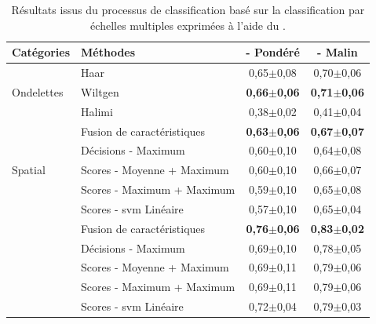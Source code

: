 \begin{table}[H]
    \centering
    \begin{tabular}{llcc}
        \toprule
        Catégories                  & Méthodes                      & \Fscore{} - Pondéré   & \Fscore{} - Malin     \\ \midrule
        \multirow{3}{*}{Ondelettes} & Haar                          & 0,65$\pm$0,08         & 0,70$\pm$0,06         \\
                                    & Wiltgen~\cite{Wiltgen2008}    & \textbf{0,66$\pm$0,06}& \textbf{0,71$\pm$0,06}\\
                                    & Halimi~\cite{Halimi2017a}     & 0,38$\pm$0,02         & 0,41$\pm$0,04         \\ \midrule
        \multirow{5}{*}{Spatial}    & Fusion de caractéristiques    & \textbf{0,63$\pm$0,06}& \textbf{0,67$\pm$0,07}\\
                                    & Décisions - Maximum           & 0,60$\pm$0,10         & 0,64$\pm$0,08         \\
                                    & Scores - Moyenne + Maximum    & 0,60$\pm$0,10         & 0,66$\pm$0,07         \\
                                    & Scores - Maximum + Maximum    & 0,59$\pm$0,10         & 0,65$\pm$0,08         \\
                                    & Scores - \gls{svm} Linéaire   & 0,57$\pm$0,10         & 0,65$\pm$0,04         \\ \midrule \rowcolor[HTML]{E7E6E6}
        \multirow{5}{*}{Transfert}  & Fusion de caractéristiques    & \textbf{0,76$\pm$0,06}& \textbf{0,83$\pm$0,02}\\ 
                                    & Décisions - Maximum           & 0,69$\pm$0,10         & 0,78$\pm$0,05         \\
                                    & Scores - Moyenne + Maximum    & 0,69$\pm$0,11         & 0,79$\pm$0,06         \\
                                    & Scores - Maximum + Maximum    & 0,69$\pm$0,11         & 0,79$\pm$0,06         \\
                                    & Scores - \gls{svm} Linéaire   & 0,72$\pm$0,04         & 0,79$\pm$0,03         \\
        \bottomrule
    \end{tabular}
    \caption{Résultats issus du processus de classification basé sur la classification par échelles multiples exprimées à l'aide du \fscore.}
    \vspace{-1em}
    \label{tab:results_image_improvement_multiresolution}
\end{table}

